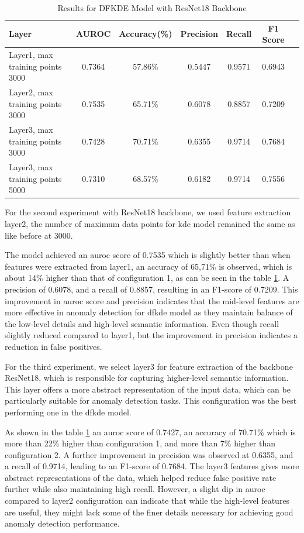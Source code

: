 \begin{table}[ht!]
    \centering
    \begin{tabular}{|l|c|c|c|c|c|c|}
        \hline
        \textbf{Layer} & \textbf{AUROC} & \textbf{Accuracy(\%)} & \textbf{Precision} & \textbf{Recall} & \textbf{F1 Score} \\ \hline
        Layer1, max training points 3000 & 0.7364 & 57.86\% & 0.5447 & 0.9571 & 0.6943 \\ \hline
        Layer2, max training points 3000 & 0.7535 & 65.71\% & 0.6078 & 0.8857 & 0.7209 \\ \hline
        Layer3, max training points 3000 & 0.7428 & 70.71\% & 0.6355 & 0.9714 & 0.7684 \\ \hline
        Layer3, max training points 5000 & 0.7310 & 68.57\% & 0.6182 & 0.9714 & 0.7556 \\ \hline
    \end{tabular}
    \caption{Results for DFKDE Model with ResNet18 Backbone}
    \label{tab:dfkde resnet18 results}
\end{table}

For the second experiment with ResNet18 backbone, we used feature extraction layer2, the number of maximum data points for \gls{kde} model remained the same as like before at 3000.

The model achieved an \gls{auroc} score of 0.7535 which is slightly better than when features were extracted from layer1, an accuracy of 65,71\% is observed, which is about 14\% higher than that of configuration 1, as can be seen in the table \ref{tab:dfkde resnet18 results}. A precision of 0.6078, and a recall of 0.8857, resulting in an F1-score of 0.7209. This improvement in \gls{auroc} score and precision indicates that the mid-level features are more effective in anomaly detection for \gls{dfkde} model as they maintain balance of the low-level details and high-level semantic information. Even though recall slightly reduced compared to layer1, but the improvement in precision indicates a reduction in false positives.

For the third experiment, we select layer3 for feature extraction of the backbone ResNet18, which is responsible for capturing higher-level semantic information. This layer offers a more abstract representation of the input data, which can be particularly suitable for anomaly detection tasks. This configuration was the best performing one in the \gls{dfkde} model.

As shown in the table \ref{tab:dfkde resnet18 results} an \gls{auroc} score of 0.7427, an accuracy of 70.71\% which is more than 22\% higher than configuration 1, and more than 7\% higher than configuration 2. A further improvement in precision was observed at 0.6355, and a recall of 0.9714, leading to an F1-score of 0.7684. The layer3 features gives more abstract representations of the data, which helped reduce false positive rate further while also maintaining high recall. However, a slight dip in \gls{auroc} compared to layer2 configuration can indicate that while the high-level features are useful, they might lack some of the finer details necessary for achieving good anomaly detection performance.

